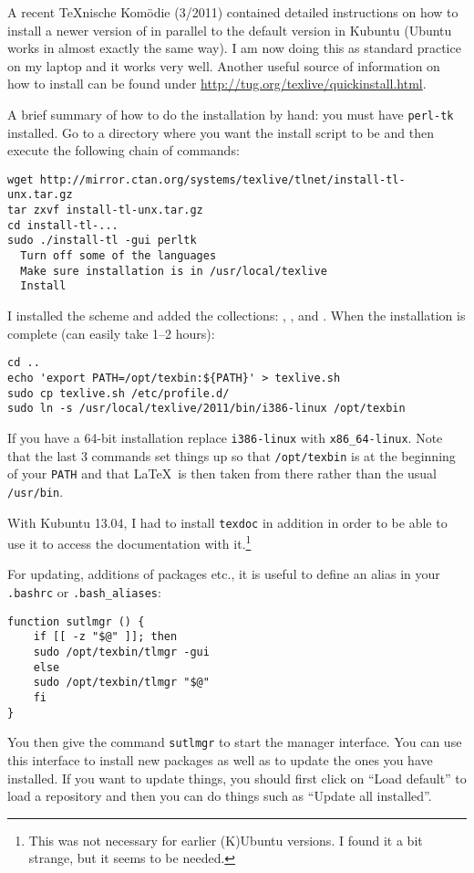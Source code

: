 A recent \TeX nische Komödie (3/2011) contained detailed instructions on
how to install a newer version of \TeXLive in parallel to the
default version in Kubuntu (Ubuntu works in almost exactly the
same way). I am now doing this as standard practice on my laptop
and it works very well. Another useful source of information on how to
install \TeXLive can be found under
\url{http://tug.org/texlive/quickinstall.html}.

A brief summary of how to do the installation by hand: you must have
\texttt{perl-tk} installed.  Go to a directory where you want the
install script to be and then execute the following chain of commands:
\begin{verbatim}
wget http://mirror.ctan.org/systems/texlive/tlnet/install-tl-unx.tar.gz
tar zxvf install-tl-unx.tar.gz
cd install-tl-...
sudo ./install-tl -gui perltk
  Turn off some of the languages
  Make sure installation is in /usr/local/texlive
  Install
\end{verbatim}
I installed the scheme  and added the
collections: , ,  and
.  When the
installation is complete (can easily take \numrange{1}{2} hours):
\begin{verbatim}
cd ..
echo 'export PATH=/opt/texbin:${PATH}' > texlive.sh
sudo cp texlive.sh /etc/profile.d/
sudo ln -s /usr/local/texlive/2011/bin/i386-linux /opt/texbin
\end{verbatim}
If you have a 64-bit installation replace \texttt{i386-linux} with
\texttt{x86\_64-linux}. Note that the last 3 commands set things up so
that \texttt{/opt/texbin} is at the beginning of your \texttt{PATH}
and that \LaTeX\ is then taken from there rather than the usual
\texttt{/usr/bin}.

With Kubuntu 13.04, I had to install \texttt{texdoc} in addition in
order to be able to use it to access the documentation with
it.\footnote{This was not necessary for earlier (K)Ubuntu versions. I
  found it a bit strange, but it seems to be needed.}

For updating, additions of packages etc., it is useful to define an
alias in your \texttt{.bashrc} or \texttt{.bash\_aliases}:
\begin{verbatim}
function sutlmgr () {
    if [[ -z "$@" ]]; then
	sudo /opt/texbin/tlmgr -gui
    else
	sudo /opt/texbin/tlmgr "$@"
    fi
}
\end{verbatim}
You then give the command \texttt{sutlmgr} to start the \TeXLive
manager interface. You can use this interface to install new packages
as well as to update the ones you have installed. If you want to
update things, you should first click on \enquote{Load default} to
load a repository and then you can do things such as \enquote{Update
  all installed}.


